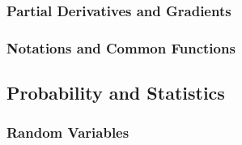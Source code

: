 \documentclass[12pt]{article}
\begin{document}
\subsubsection{Partial Derivatives and Gradients}
\subsubsection{Notations and Common Functions}
\subsection{Probability and Statistics}
\subsubsection{Random Variables}
\end{document}
